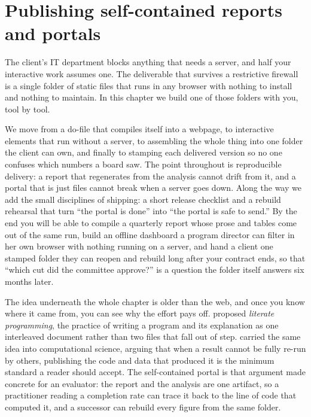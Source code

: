 \documentclass[
    a4paper,
    fontsize=10pt,
    twoside=true,
    numbers=noenddot,
]{kaobook}
\begin{document}
\chapter{Publishing self-contained reports and portals}\label{ch:portals}

The client's IT department blocks anything that needs a server, and half your interactive work assumes one. The deliverable that survives a restrictive firewall is a single folder of static files that runs in any browser with nothing to install and nothing to maintain. In this chapter we build one of those folders with you, tool by tool.

We move from a do-file that compiles itself into a webpage, to interactive elements that run without a server, to assembling the whole thing into one folder the client can own, and finally to stamping each delivered version so no one confuses which numbers a board saw. The point throughout is reproducible delivery: a report that regenerates from the analysis cannot drift from it, and a portal that is just files cannot break when a server goes down. Along the way we add the small disciplines of shipping: a short release checklist and a rebuild rehearsal that turn \enquote{the portal is done} into \enquote{the portal is safe to send.} By the end you will be able to compile a quarterly report whose prose and tables come out of the same run, build an offline dashboard a program director can filter in her own browser with nothing running on a server, and hand a client one stamped folder they can reopen and rebuild long after your contract ends, so that \enquote{which cut did the committee approve?} is a question the folder itself answers six months later.

The idea underneath the whole chapter is older than the web, and once you know where it came from, you can see why the effort pays off. \textcite{knuth1984literate} proposed \emph{literate programming}, the practice of writing a program and its explanation as one interleaved document rather than two files that fall out of step. \textcite{peng2011reproducible} carried the same idea into computational science, arguing that when a result cannot be fully re-run by others, publishing the code and data that produced it is the minimum standard a reader should accept. The self-contained portal is that argument made concrete for an evaluator: the report and the analysis are one artifact, so a practitioner reading a completion rate can trace it back to the line of code that computed it, and a successor can rebuild every figure from the same folder.
\end{document}
